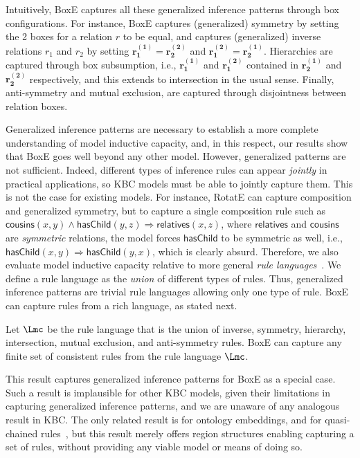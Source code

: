 \documentclass{article}
\begin{document}
Intuitively, BoxE captures all these generalized inference patterns through box configurations. For instance, BoxE captures (generalized) symmetry by setting the 2 boxes for a relation $r$ to be equal, and captures (generalized) inverse relations $r_1$ and $r_{2}$ by setting $\bm{r_1^{(1)}} = \bm{r_{2}^{(2)}}$ and $\bm{r_1^{(2)}} = \bm{r_{2}^{(1)}}$. Hierarchies are captured through box subsumption, i.e., $\bm{r_1^{(1)}}$ and $\bm{r_1^{(2)}}$ contained in $\bm{r_{2}^{(1)}}$ and $\bm{r_{2}^{(2)}}$ respectively, and this extends to intersection in the usual sense. Finally, anti-symmetry and mutual exclusion, are captured through disjointness between relation boxes.

Generalized inference patterns are necessary to establish a more complete understanding of model inductive capacity, and, in this respect,  our results show that BoxE goes well beyond any other model. However, generalized patterns are not sufficient. Indeed, different types of inference rules can appear \emph{jointly} in practical applications, so KBC models must be able to jointly capture them. This is not the case for existing models. For instance, RotatE can capture composition and generalized symmetry, but to capture a single composition rule such as $\mathsf{cousins}(x,y)  \land \mathsf{hasChild}(y,z)\Rightarrow \mathsf{relatives}(x,z)$, 
where $\mathsf{relatives}$ and $\mathsf{cousins}$ are \emph{symmetric} relations, the model forces $\mathsf{hasChild}$ to be symmetric as well, i.e., $\mathsf{hasChild}(x,y) \Rightarrow \mathsf{hasChild}(y,x)$, which is clearly absurd.
Therefore, we also evaluate model inductive capacity relative to more general \emph{rule languages}~\cite{Gutirrez18}. We define a rule language as the \emph{union} of different types of rules. Thus,  generalized inference patterns are trivial rule languages allowing only one type of rule. 
BoxE can capture rules from a rich language, as stated next.

\begin{theorem}
\label{thm:InfPat} 
Let $\Lmc$ be the rule language that is the union of inverse, symmetry, hierarchy, intersection, mutual exclusion, and anti-symmetry rules.
BoxE can capture any finite set of consistent rules from the rule language $\Lmc$.
\end{theorem}

This result captures generalized inference patterns for BoxE as a special case. Such a result is implausible for other KBC models, given their limitations in capturing generalized inference patterns, and we are unaware of any analogous result in KBC. The only related result is for ontology embeddings, and for quasi-chained rules~\cite{Gutirrez18}, but this result merely offers region structures enabling capturing a set of rules, without providing any viable model or means of doing so. 
\end{document}

